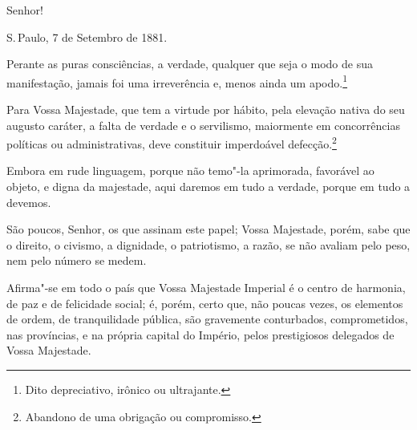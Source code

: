 Senhor!

S.\,Paulo, 7 de Setembro de 1881.

Perante as puras consciências, a verdade, qualquer que seja o modo de
sua manifestação, jamais foi uma irreverência e, menos ainda um
apodo.\footnote{Dito depreciativo, irônico ou ultrajante.}

Para Vossa Majestade, que tem a virtude por hábito, pela elevação nativa
do seu augusto caráter, a falta de verdade e o servilismo, maiormente em
concorrências políticas ou administrativas, deve constituir imperdoável
defecção.\footnote{Abandono de uma obrigação ou compromisso.}

Embora em rude linguagem, porque não temo"-la aprimorada, favorável ao
objeto, e digna da majestade, aqui daremos em tudo a verdade, porque em
tudo a devemos.

São poucos, Senhor, os que assinam este papel; Vossa Majestade, porém,
sabe que o direito, o civismo, a dignidade, o patriotismo, a razão, se
não avaliam pelo peso, nem pelo número se medem. \enlargethispage{\baselineskip}


Afirma"-se em todo o país que Vossa Majestade Imperial é o centro de
harmonia, de paz e de felicidade social; é, porém, certo que, não poucas
vezes, os elementos de ordem, de tranquilidade pública, são gravemente
conturbados, comprometidos, nas províncias, e na própria capital do
Império, pelos prestigiosos delegados de Vossa Majestade.

